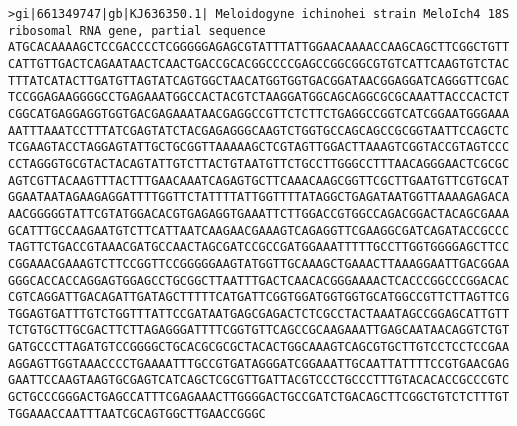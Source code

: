 \documentclass[11pt]{article}
\begin{document}
\begin{Verbatim}[commandchars=\\\{\}]
>gi|661349747|gb|KJ636350.1| Meloidogyne ichinohei strain MeloIch4 18S ribosomal RNA gene, partial sequence
ATGCACAAAAGCTCCGACCCCTCGGGGGAGAGCGTATTTATTGGAACAAAACCAAGCAGCTTCGGCTGTT
CATTGTTGACTCAGAATAACTCAACTGACCGCACGGCCCCGAGCCGGCGGCGTGTCATTCAAGTGTCTAC
TTTATCATACTTGATGTTAGTATCAGTGGCTAACATGGTGGTGACGGATAACGGAGGATCAGGGTTCGAC
TCCGGAGAAGGGGCCTGAGAAATGGCCACTACGTCTAAGGATGGCAGCAGGCGCGCAAATTACCCACTCT
CGGCATGAGGAGGTGGTGACGAGAAATAACGAGGCCGTTCTCTTCTGAGGCCGGTCATCGGAATGGGAAA
AATTTAAATCCTTTATCGAGTATCTACGAGAGGGCAAGTCTGGTGCCAGCAGCCGCGGTAATTCCAGCTC
TCGAAGTACCTAGGAGTATTGCTGCGGTTAAAAAGCTCGTAGTTGGACTTAAAGTCGGTACCGTAGTCCC
CCTAGGGTGCGTACTACAGTATTGTCTTACTGTAATGTTCTGCCTTGGGCCTTTAACAGGGAACTCGCGC
AGTCGTTACAAGTTTACTTTGAACAAATCAGAGTGCTTCAAACAAGCGGTTCGCTTGAATGTTCGTGCAT
GGAATAATAGAAGAGGATTTTGGTTCTATTTTATTGGTTTTATAGGCTGAGATAATGGTTAAAAGAGACA
AACGGGGGTATTCGTATGGACACGTGAGAGGTGAAATTCTTGGACCGTGGCCAGACGGACTACAGCGAAA
GCATTTGCCAAGAATGTCTTCATTAATCAAGAACGAAAGTCAGAGGTTCGAAGGCGATCAGATACCGCCC
TAGTTCTGACCGTAAACGATGCCAACTAGCGATCCGCCGATGGAAATTTTTGCCTTGGTGGGGAGCTTCC
CGGAAACGAAAGTCTTCCGGTTCCGGGGGAAGTATGGTTGCAAAGCTGAAACTTAAAGGAATTGACGGAA
GGGCACCACCAGGAGTGGAGCCTGCGGCTTAATTTGACTCAACACGGGAAAACTCACCCGGCCCGGACAC
CGTCAGGATTGACAGATTGATAGCTTTTTCATGATTCGGTGGATGGTGGTGCATGGCCGTTCTTAGTTCG
TGGAGTGATTTGTCTGGTTTATTCCGATAATGAGCGAGACTCTCGCCTACTAAATAGCCGGAGCATTGTT
TCTGTGCTTGCGACTTCTTAGAGGGATTTTCGGTGTTCAGCCGCAAGAAATTGAGCAATAACAGGTCTGT
GATGCCCTTAGATGTCCGGGGCTGCACGCGCGCTACACTGGCAAAGTCAGCGTGCTTGTCCTCCTCCGAA
AGGAGTTGGTAAACCCCTGAAAATTTGCCGTGATAGGGATCGGAAATTGCAATTATTTTCCGTGAACGAG
GAATTCCAAGTAAGTGCGAGTCATCAGCTCGCGTTGATTACGTCCCTGCCCTTTGTACACACCGCCCGTC
GCTGCCCGGGACTGAGCCATTTCGAGAAACTTGGGGACTGCCGATCTGACAGCTTCGGCTGTCTCTTTGT
TGGAAACCAATTTAATCGCAGTGGCTTGAACCGGGC


\end{Verbatim}
\end{document}
